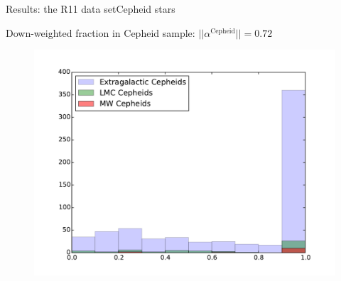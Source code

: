 \documentclass{beamer}
\newcommand{\Cepheid}{\mathrm{Cepheid}}
\newcommand{\Anchors}{\mathrm{Anchors}}
\newcommand{\SNe}{\mathrm{SNe\,Ia}}
\begin{document}
%
%
%
%
%
%

\begin{frame}{Results: the R11 data set}{Cepheid stars}
\begin{center}
Down-weighted fraction in Cepheid sample: $|| \alpha^{\Cepheid}|| = 0.72$
\end{center}
\begin{figure}
\includegraphics[scale=0.4]{../figures/chapter-h0/effective_HP_histogram.pdf} 
\end{figure}
\end{frame}
\end{document}
